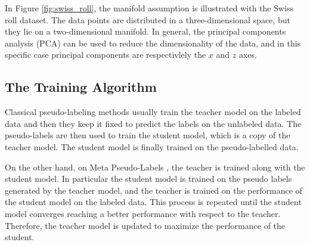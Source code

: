 In Figure \ref{fig:swiss_roll}, the manifold assumption is illustrated with the 
Swiss roll dataset. The data points are distributed in a three-dimensional 
space, but they lie on a two-dimensional manifold. In general, the principal 
components analysis (PCA) can be used to reduce the dimensionality of the data, 
and in this specific case principal components are respectivlely the $x$ and $z$ 
axes.


\subsection{The Training Algorithm}
Classical pseudo-labeling methods usually train the teacher model on the labeled 
data and then they keep it fixed to predict the labels on the unlabeled data. 
The pseudo-labels are then used to train the student model, which is a copy of 
the teacher model. The student model is finally trained on the pseudo-labelled 
data.

On the other hand, on Meta Pseudo-Labels \cite{pham2021meta}, the teacher is 
trained along with the student model. In particular the student model is trained 
on the pseudo labels generated by the teacher model, and the teacher is trained 
on the performance of the student model on the labeled data. This process is 
repeated until the student model converges reaching a better performance 
with respect to the teacher. Therefore, the teacher model is updated to 
maximize the performance of the student.

